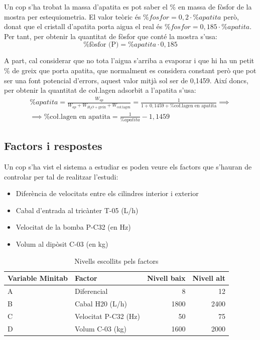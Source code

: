\documentclass[a4paper]{article}
\begin{document}
Un cop s'ha trobat la massa d'apatita es pot saber el \% en massa de fòsfor de la mostra per estequiometria. El valor teòric és $\% fosfor = 0,2 \cdot \% apatita$ però, donat que el cristall d'apatita porta aigua el real és $\% fosfor = 0,185 \cdot \% apatita$. Per tant, per obtenir la quantitat de fòsfor que conté la mostra s'usa:
$$
\boxed{\% \text{fòsfor (P)} = \% apatita \cdot 0,185}
$$

A part, cal considerar que no tota l'aigua s'arriba a evaporar i que hi ha un petit \% de greix que porta apatita, que normalment es considera constant però que pot ser una font potencial d'errors, aquest valor mitjà sol ser de 0,1459. Així doncs, per obtenir la quantitat de co\l.lagen adsorbit a l'apatita s'usa:
\begin{gather*}
	\% apatita =
	\frac{W_{ap}}{W_{ap} + W_{H_2O + \text{greix}} + W_{\text{co\l.lagen}}} =
	\frac{1}{1 + 0,1459 + \% \text{co\l.lagen en apatita}} \implies \\
	\implies 
	\boxed{\% \text{co\l.lagen en apatita} = \frac{1}{\% apatita} - 1,1459}
\end{gather*}

\subsection{Factors i respostes}

Un cop s'ha vist el sistema a estudiar es poden veure els factors que s'hauran de controlar per tal de realitzar l'estudi:

\begin{itemize}
	\item Diferència de velocitats entre els cilindres interior i exterior
	\item Cabal d'entrada al tricànter T-05 (L/h)
	\item Velocitat de la bomba P-C32 (en Hz)
	\item Volum al dipòsit C-03 (en kg)
\end{itemize}

\begin{table}[H]
	\centering
	\begin{tabular}{ l | l | r | r }
		\rowcolor{gray!60}
		Variable Minitab & Factor & Nivell baix & Nivell alt \\ \hline
		A & Diferencial & 8 & 12 \\
		B & Cabal H20 (L/h)& 1800 & 2400 \\
		C & Velocitat P-C32 (Hz) & 50 & 75 \\
		D & Volum C-03 (kg) & 1600 & 2000 \\
	\end{tabular}
	\caption{Nivells escollits pels factors}
\end{table}
\end{document}

